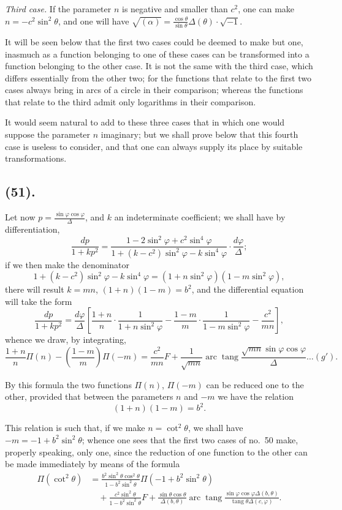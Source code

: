 \documentclass{article}
\begin{document}
\emph{Third case.} If the parameter $n$ is negative and smaller than $c^{2}$, one can make $n=-c^{2}\sin^{2}\theta$, and one will have $\sqrt{(\alpha)}=\frac{\cos\theta}{\sin\theta}\Delta(\theta)\cdot\sqrt{-1}$.

It will be seen below that the first two cases could be deemed to make but one, inasmuch as a function belonging to one of these cases can be transformed into a function belonging to the other case. It is not the same with the third case, which differs essentially from the other two; for the functions that relate to the first two cases always bring in arcs of a circle in their comparison; whereas the functions that relate to the third admit only logarithms in their comparison.

It would seem natural to add to these three cases that in which one would suppose the parameter $n$ imaginary; but we shall prove below that this fourth case is useless to consider, and that one can always supply its place by suitable transformations.

\subsection*{(51).}

Let now $p=\frac{\sin\varphi\cos\varphi}{\Delta}$, and $k$ an indeterminate coefficient; we shall have by differentiation,
\[ \frac{dp}{1+kp^{2}}=\frac{1-2\sin^{2}\varphi+c^{2}\sin^{4}\varphi}{1+(k-c^{2})\sin^{2}\varphi-k\sin^{4}\varphi}\cdot\frac{d\varphi}{\Delta}; \]
if we then make the denominator
\[ 1+(k-c^{2})\sin^{2}\varphi-k\sin^{4}\varphi=(1+n\sin^{2}\varphi)(1-m\sin^{2}\varphi), \]
there will result $k=mn$, $(1+n)(1-m)=b^{2}$, and the differential equation will take the form
\[ \frac{dp}{1+kp^{2}}=\frac{d\varphi}{\Delta}\left[\frac{1+n}{n}\cdot\frac{1}{1+n\sin^{2}\varphi}-\frac{1-m}{m}\cdot\frac{1}{1-m\sin^{2}\varphi}-\frac{c^{2}}{mn}\right], \]
whence we draw, by integrating,
\[ \frac{1+n}{n}\Pi(n)-\left(\frac{1-m}{m}\right)\Pi(-m)=\frac{c^{2}}{mn}F+\frac{1}{\sqrt{mn}}\operatorname{arc}\operatorname{tang}\frac{\sqrt{mn}\sin\varphi\cos\varphi}{\Delta}\ldots(g'). \]

By this formula the two functions $\Pi(n)$, $\Pi(-m)$ can be reduced one to the other, provided that between the parameters $n$ and $-m$ we have the relation
\[ (1+n)(1-m)=b^{2}. \]

This relation is such that, if we make $n=\cot^{2}\theta$, we shall have $-m=-1+b^{2}\sin^{2}\theta$; whence one sees that the first two cases of no.\ 50 make, properly speaking, only one, since the reduction of one function to the other can be made immediately by means of the formula
\[ \begin{aligned} \Pi(\cot^{2}\theta)&=\frac{b^{2}\sin^{2}\theta\cos^{2}\theta}{1-b^{2}\sin^{2}\theta}\Pi(-1+b^{2}\sin^{2}\theta)\\ &\quad+\frac{c^{2}\sin^{2}\theta}{1-b^{2}\sin^{2}\theta}F+\frac{\sin\theta\cos\theta}{\Delta(b,\theta)}\operatorname{arc}\operatorname{tang}\frac{\sin\varphi\cos\varphi\Delta(b,\theta)}{\operatorname{tang}\theta\Delta(c,\varphi)}. \end{aligned} \]
\end{document}
